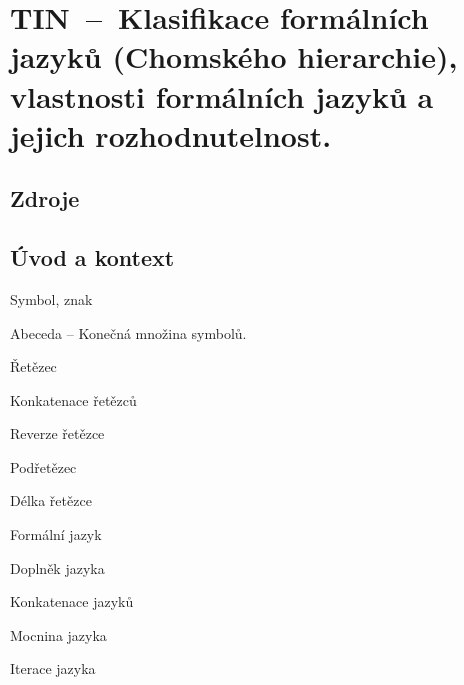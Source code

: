

\graphicspath{{tin/klasifikace_jazyku/figures}}


\chapter{TIN~--~Klasifikace formálních jazyků (Chomského hierarchie), vlastnosti formálních jazyků a jejich rozhodnutelnost.}



\section{Zdroje}

\begin{compactitem}
    \item {}
    \item {}
    \item {}
\end{compactitem}


\section{Úvod a kontext}

\begin{compactitem}
    \item Symbol, znak
    \item Abeceda -- Konečná množina symbolů.
    \item Řetězec
    \item Konkatenace řetězců
    \item Reverze řetězce
    \item Podřetězec
    \item Délka řetězce
    \item Formální jazyk
    \item Doplněk jazyka
    \item Konkatenace jazyků
    \item Mocnina jazyka
    \item Iterace jazyka
\end{compactitem}

